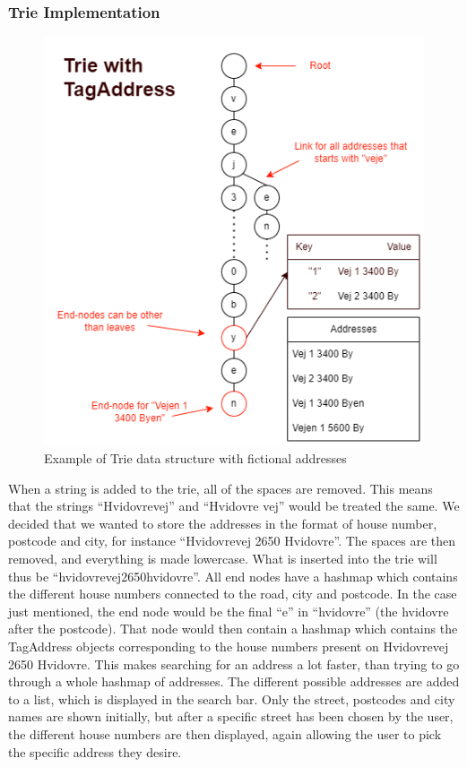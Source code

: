 \subsubsection{Trie Implementation}
\begin{figure}
\includegraphics[width=0.9\linewidth]{docs/material/Trie Diagram.png} 
\caption{Example of Trie data structure with fictional addresses}\label{Trie/implementation}
\label{fig:wrapfig}
\end{figure}
When a string is added to the trie, all of the spaces are removed. This means that the strings “Hvidovrevej” and “Hvidovre vej” would be treated the same. 
We decided that we wanted to store the addresses in the format of house number, 
postcode and city, for instance “Hvidovrevej 2650 Hvidovre”. The spaces are then removed, and everything is made lowercase. What is inserted into the trie will thus be “hvidovrevej2650hvidovre”. All end nodes have a hashmap which contains the different house numbers connected to the road, city and postcode. In the case just mentioned, the end node would be the final “e” in “hvidovre” (the hvidovre after the postcode). That node would then contain a hashmap which contains the TagAddress objects corresponding to the house numbers present on Hvidovrevej 2650 Hvidovre. This makes searching for an address a lot faster, than trying to go through a whole hashmap of addresses. The different possible addresses are added to a list, which is displayed in the search bar. Only the street, postcodes and city names are shown initially, but after a specific street has been chosen by the user, the different house numbers are then displayed, again allowing the user to pick the specific address they desire.\\
